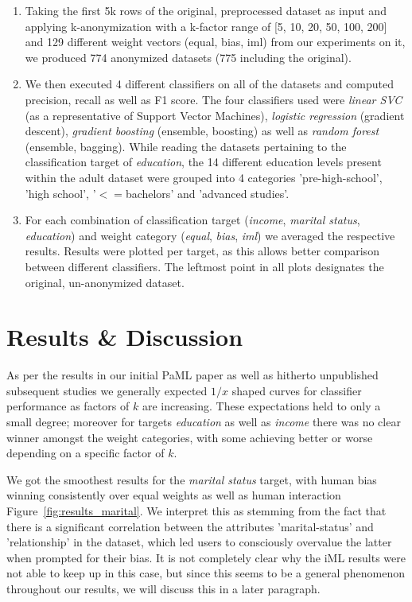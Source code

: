 \documentclass{llncs}
\begin{document}
\begin{enumerate}
	\item Taking the first 5k rows of the original, preprocessed dataset as input and applying k-anonymization with a k-factor range of [5, 10, 20, 50, 100, 200] and 129 different weight vectors (equal, bias, iml) from our experiments on it, we produced 774 anonymized datasets (775 including the original).
	\item We then executed 4 different classifiers on all of the datasets and computed precision, recall as well as F1 score. The four classifiers used were \textit{linear SVC} (as a representative of Support Vector Machines), \textit{logistic regression} (gradient descent), \textit{gradient boosting} (ensemble, boosting) as well as \textit{random forest} (ensemble, bagging). While reading the datasets pertaining to the classification target of \textit{education}, the 14 different education levels present within the adult dataset were grouped into 4 categories 'pre-high-school', 'high school', '$<=$bachelors' and 'advanced studies'.
	\item For each combination of classification target (\textit{income}, \textit{marital status}, \textit{education}) and weight category (\textit{equal}, \textit{bias}, \textit{iml}) we averaged the respective results. Results were plotted per target, as this allows better comparison between different classifiers. The leftmost point in all plots designates the original, un-anonymized dataset.
\end{enumerate}


\section{Results \& Discussion}
\label{sect:results}

As per the results in our initial PaML paper \cite{malle2016right} as well as hitherto unpublished subsequent studies we generally expected $1/x$ shaped curves for classifier performance as factors of $k$ are increasing. These expectations held to only a small degree; moreover for targets \textit{education} as well as \textit{income} there was no clear winner amongst the weight categories, with some achieving better or worse depending on a specific factor of $k$.

We got the smoothest results for the \textit{marital status} target, with human bias winning consistently over equal weights as well as human interaction Figure~\ref{fig:results_marital}. We interpret this as stemming from the fact that there is a significant correlation between the attributes 'marital-status' and 'relationship' in the dataset, which led users to consciously overvalue the latter when prompted for their bias. It is not completely clear why the iML results were not able to keep up in this case, but since this seems to be a general phenomenon throughout our results, we will discuss this in a later paragraph.
\end{document}
